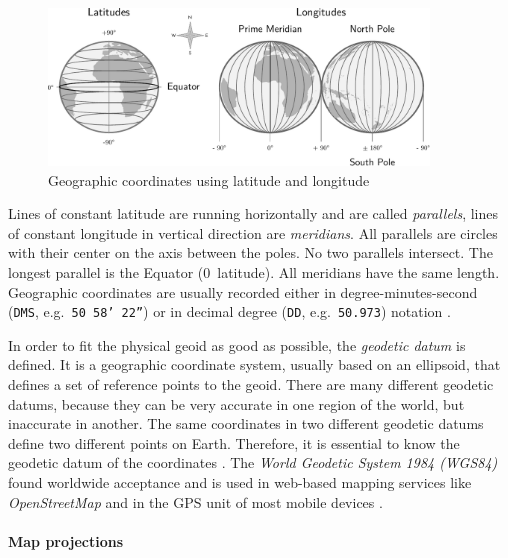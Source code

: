 \begin{figure}[ht]
  \vspace{0.5em}
  \centering
  \includegraphics[width=0.9\textwidth]{graphics/basics/hgis/geo_coordinates}
  \caption{Geographic coordinates using latitude and longitude}
  \label{fig:geo-coordinates}
\end{figure}

Lines of constant latitude are running horizontally and are called \emph{parallels}, lines of constant longitude in vertical direction are \emph{meridians}. All parallels are circles with their center on the axis between the poles. No two parallels intersect. The longest parallel is the Equator (0\degree~latitude). All meridians have the same length. Geographic coordinates are usually recorded either in degree-minutes-second (\texttt{DMS}, e.g.\ \texttt{50\degree~58' 22''}) or in decimal degree (\texttt{DD}, e.g.\ \texttt{50.973}) notation
\cite[pp. 30, 79]{bolstad2008gis}.

In order to fit the physical geoid as good as possible, the \emph{geodetic datum} is defined. It is a geographic coordinate system, usually based on an ellipsoid, that defines a set of reference points to the geoid. There are many different geodetic datums, because they can be very accurate in one region of the world, but inaccurate in another. The same coordinates in two different geodetic datums define two different points on Earth. Therefore, it is essential to know the geodetic datum of the coordinates \cite[p. 80]{bolstad2008gis}.
The \emph{World Geodetic System 1984 (WGS84)} found worldwide acceptance and is used in web-based mapping services like \emph{OpenStreetMap} and in the GPS unit of most mobile devices \cite{wgs84}.


\paragraph{Map projections} %
\label{par:map_projections}


